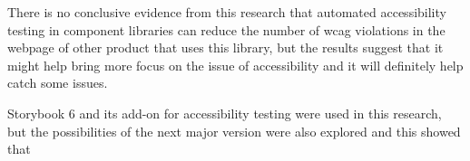\documentclass{master_thesis}
\begin{document}
There is no conclusive evidence from this research that automated accessibility testing in component libraries can reduce the number of \ac{wcag} violations in the webpage of other product that uses this library, but the results suggest that it might help bring more focus on the issue of accessibility and it will definitely help catch some issues.

Storybook 6 and its add-on for accessibility testing were used in this research, but the possibilities of the next major version were also explored and this showed that
\end{document}
